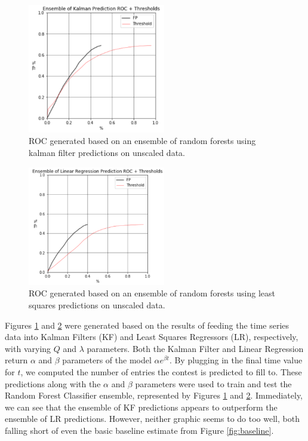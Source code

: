 \begin{figure}[h]
\centering
\includegraphics[width=6cm]{body/results/ensKF.png}
\caption{ROC generated based on an ensemble of random forests using kalman filter predictions on unscaled data.}
\label{fig:unKF}
\end{figure}

\begin{figure}[h]
\centering
\includegraphics[width=6cm]{body/results/ensLR.png}
\caption{ROC generated based on an ensemble of random forests using least squares predictions on unscaled data.}
\label{fig:unLR}
\end{figure}
Figures \ref{fig:unKF} and \ref{fig:unLR} were generated based on the results of feeding the time series data into Kalman Filters (KF) and Least Squares Regressors (LR), respectively, with varying $Q$ and $\lambda$ parameters. Both the Kalman Filter and Linear Regression return $\alpha$ and $\beta$ parameters of the model $\alpha e^{\beta t}$. By plugging in the final time value for $t$, we computed the number of entries the contest is predicted to fill to. These predictions along with the $\alpha$ and $\beta$ parameters were used to train and test the Random Forest Classifier ensemble, represented by Figures \ref{fig:unKF} and \ref{fig:unLR}. Immediately, we can see that the ensemble of KF predictions appears to outperform the ensemble of LR predictions.
However, neither graphic seems to do too well, both falling short of even the basic baseline estimate from Figure \ref{fig:baseline}. 

